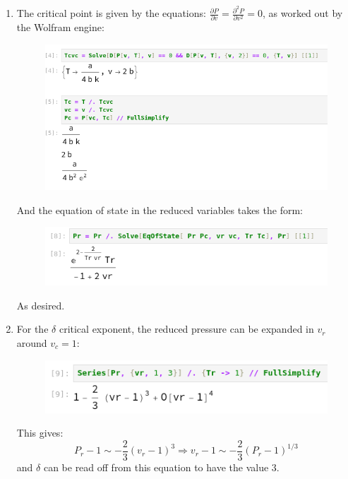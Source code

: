 \documentclass[12pt,a4]{article}
\begin{document}
\begin{enumerate}
    \begin{enumerate}
      \item
        The critical point is given by the equations: $\frac{\partial P}{\partial v} = \frac{\partial^2 P}{\partial v^2} = 0$, as worked out by the Wolfram engine:
        \begin{figure}[H]
          \begin{center}
            \includegraphics[scale = 0.8]{criticalPoint.png}
          \end{center}
        \end{figure}
        And the equation of state in the reduced variables takes the form:
        \begin{figure}[H]
          \begin{center}
            \includegraphics[scale = 0.8]{eqStateRedVar.png}
          \end{center}
        \end{figure}
        As desired.
      \item
        For the $\delta$ critical exponent, the reduced pressure can be expanded in $v_r$ around $v_c = 1$:
        \begin{figure}[H]
          \begin{center}
            \includegraphics[scale = 0.8]{delta.png}
          \end{center}
        \end{figure}
        This gives:
        \begin{equation*}
          P_r - 1 \sim -\frac{2}{3} (v_r - 1)^3 \Rightarrow v_r -1 \sim -\frac{2}{3}(P_r - 1)^{1/3}
        \end{equation*}
        and $\delta$ can be read off from this equation to have the value $3$.\\


\end{enumerate}
\end{enumerate}
\end{document}
